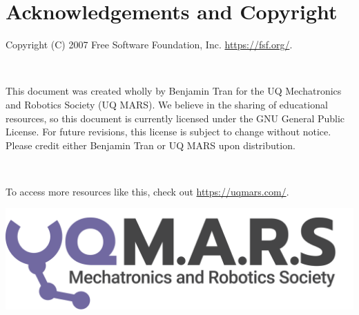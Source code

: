 \chapter{Acknowledgements and Copyright}

Copyright (C) 2007 Free Software Foundation, Inc. \url{https://fsf.org/}.

$ $

This document was created wholly by Benjamin Tran for the UQ Mechatronics and Robotics Society (UQ MARS). We believe in the sharing of educational resources, so this document is currently licensed under the GNU General Public License. For future revisions, this license is subject to change without notice. Please credit either Benjamin Tran or UQ MARS upon distribution.

$ $

To access more resources like this, check out \url{https://uqmars.com/}.

\begin{center}
    \vspace*{120mm}
    \includegraphics[width=0.7\paperwidth]{./assets/Logo (Dark).png} \\
    \vspace{1cm}
\end{center}